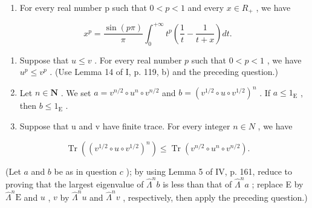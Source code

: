 \begin{enumerate}
\def\labelenumi{\alph{enumi})}
\tightlist
\item
  For every real number p such that \(0 < p < 1\) and every \(x \in R_{+}\) , we have
\end{enumerate}

\[
x ^ {p} = \frac {\sin (p \pi)}{\pi} \int_ {0} ^ {+ \infty} t ^ {p} \left(\frac {1}{t} - \frac {1}{t + x}\right) d t.
\]

\begin{enumerate}
\def\labelenumi{\alph{enumi})}
\setcounter{enumi}{1}
\item
  Suppose that \(u \leqslant v\) . For every real number \(p\) such that \(0 < p < 1\) , we have \(u^p \leqslant v^p\) . (Use Lemma 14 of I, p. 119, b) and the preceding question.)\\
\item
  Let \(n \in \mathbf{N}\) . We set \(a = v^{n/2} \circ u^n \circ v^{n/2}\) and \(b = (v^{1/2} \circ u \circ v^{1/2})^n\) . If \(a \leqslant 1_{\mathrm{E}}\) , then \(b \leqslant 1_{\mathrm{E}}\) .
\item
  Suppose that u and v have finite trace. For every integer \(n \in N\) , we have
\end{enumerate}

\[
\operatorname{Tr} \left(\left(v ^ {1 / 2} \circ u \circ v ^ {1 / 2}\right) ^ {n}\right) \leqslant \operatorname{Tr} \left(v ^ {n / 2} \circ u ^ {n} \circ v ^ {n / 2}\right).
\]

(Let \(a\) and \(b\) be as in question \(c\) ); by using Lemma 5 of IV, p. 161, reduce to proving that the largest eigenvalue of \(\widehat{\Lambda}^{n}b\) is less than that of \(\widehat{\Lambda}^{n}a\) ; replace E by \(\widehat{\Lambda}^{n}\mathrm{E}\) and \(u\) , \(v\) by \(\widehat{\Lambda}^{n}u\) and \(\widehat{\Lambda}^{n}v\) , respectively, then apply the preceding question.)
\relax{}
